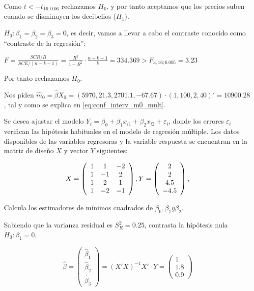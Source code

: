 \begin{problem}[7]
	Como $t<-t_{16;0.06}$ rechazamos $H_0$, y por tanto aceptamos que los precios suben cuando se disminuyen los decibelios ($H_1$).

	\spart
	$H_0:β_1=β_2=β_3=0$, es decir, vamos a llevar a cabo el contraste conocido como ``contraste de la regresión'':

	$F=\frac{SCR/R}{SCE/(n-k-1)} = \frac{R^2}{1-R^2}·\frac{n-k-1}{k}=334.369 > F_{3,16;0.005}=3.23$

	Por tanto rechazamos $H_0$.

	\spart
	Nos piden $\hat{m}_0=\hat{β}X_0 = (5970,21.3,2701.1,-67.67)·(1,100,2,40)' = 10900.28$, tal y como se explica en \ref{eq:conf_interv_m0_mult}. 
\end{problem}



\begin{problem}[8]
	Se desea ajustar el modelo $Y_i = β_0 + β_1 x_{i1} + β_2 x_{i2} + ε_i$, donde los errores $ε_i$ verifican las hipótesis habituales en el modelo de regresión múltiple. Los datos disponibles de las variables regresoras y la variable respuesta se encuentran en la matriz de diseño $X$ y vector $Y$ siguientes:

	\[
		X=
		\left(\begin{array}{c c c}
			1 & 1 & -2\\
			1 & -1 & 2\\
			1 & 2 & 1\\
			1 & -2 & -1
		\end{array}\right),
		Y = 
		\left(\begin{array}{c}
			2\\
			2\\
			4.5\\
			-4.5
		\end{array}\right),
	\]

	\ppart
	Calcula los estimadores de mínimos cuadrados de $β_0, β_1 y β_2$.

	\ppart
	Sabiendo que la varianza residual es $S_R^2 = 0.25$, contrasta la hipótesis nula $H_0 : β_1 = 0$.

	\solution

	\spart
	\[
		\hat{β} =
		\left(\begin{array}{c}
			\hat{β}_1\\
			\hat{β}_2\\
			\hat{β}_3
		\end{array}\right)
		= (X'X)^{-1}X'·Y =
		\left(\begin{array}{c}
			1\\
			1.8\\
			0.9
		\end{array}\right)
	\]


\end{problem}
